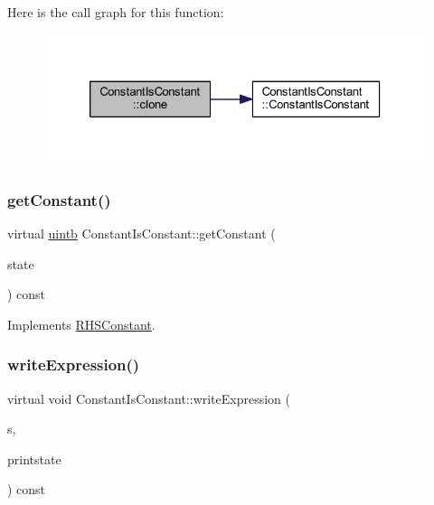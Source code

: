 Here is the call graph for this function\+:
\nopagebreak
\begin{figure}[H]
\begin{center}
\leavevmode
\includegraphics[width=326pt]{class_constant_is_constant_ac66be1ba7e938346231c0e206f5f8a65_cgraph}
\end{center}
\end{figure}
\mbox{\label{class_constant_is_constant_a026e1257509c60e833d289486edae6f0}} 
\subsubsection{\texorpdfstring{getConstant()}{getConstant()}}
{\footnotesize\ttfamily virtual \mbox{\hyperlink{types_8h_a2db313c5d32a12b01d26ac9b3bca178f}{uintb}} Constant\+Is\+Constant\+::get\+Constant (\begin{DoxyParamCaption}\item[{\mbox{\hyperlink{class_unify_state}{Unify\+State}} \&}]{state }\end{DoxyParamCaption}) const\hspace{0.3cm}{\ttfamily [virtual]}}



Implements \mbox{\hyperlink{class_r_h_s_constant_a941b5d2898cbce985a3ef9c5db6fa458}{R\+H\+S\+Constant}}.

\mbox{\label{class_constant_is_constant_ac547445e4235052567994b48c632202f}} 
\subsubsection{\texorpdfstring{writeExpression()}{writeExpression()}}
{\footnotesize\ttfamily virtual void Constant\+Is\+Constant\+::write\+Expression (\begin{DoxyParamCaption}\item[{ostream \&}]{s,  }\item[{\mbox{\hyperlink{class_unify_c_printer}{Unify\+C\+Printer}} \&}]{printstate }\end{DoxyParamCaption}) const\hspace{0.3cm}{\ttfamily [virtual]}}



